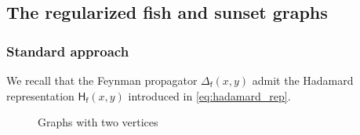 \documentclass[11pt]{book}
\newcommand{\Hsf}{\mathsf{H}}
\newcommand{\fsf}{\mathsf{f}}
\theoremstyle{break}
\begin{document}
\subsection{The regularized fish and sunset graphs}

\subsubsection{Standard approach}


We recall that the Feynman propagator $\Delta_\fsf(x,y)$ admit the Hadamard representation $\Hsf_\fsf(x,y)$ introduced in \eqref{eq:hadamard_rep}.


\begin{figure}[ht!]
\begin{center}
%
%
\end{center}
\caption{Graphs with two vertices}
\end{figure}
\end{document}
